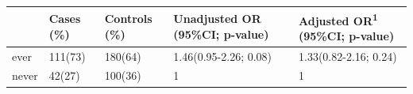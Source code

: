\begin{longtable}[]{@{}lllll@{}}
\toprule
\begin{minipage}[b]{0.06\columnwidth}\raggedright
\strut
\end{minipage} & \begin{minipage}[b]{0.10\columnwidth}\raggedright
Cases (\%)\strut
\end{minipage} & \begin{minipage}[b]{0.12\columnwidth}\raggedright
Controls (\%)\strut
\end{minipage} & \begin{minipage}[b]{0.29\columnwidth}\raggedright
Unadjusted OR (95\%CI; p-value)\strut
\end{minipage} & \begin{minipage}[b]{0.28\columnwidth}\raggedright
Adjusted OR\textsuperscript{1} (95\%CI; p-value)\strut
\end{minipage}\tabularnewline
\midrule
\endhead
\begin{minipage}[t]{0.06\columnwidth}\raggedright
ever\strut
\end{minipage} & \begin{minipage}[t]{0.10\columnwidth}\raggedright
111(73)\strut
\end{minipage} & \begin{minipage}[t]{0.12\columnwidth}\raggedright
180(64)\strut
\end{minipage} & \begin{minipage}[t]{0.29\columnwidth}\raggedright
1.46(0.95-2.26; 0.08)\strut
\end{minipage} & \begin{minipage}[t]{0.28\columnwidth}\raggedright
1.33(0.82-2.16; 0.24)\strut
\end{minipage}\tabularnewline
\begin{minipage}[t]{0.06\columnwidth}\raggedright
never\strut
\end{minipage} & \begin{minipage}[t]{0.10\columnwidth}\raggedright
42(27)\strut
\end{minipage} & \begin{minipage}[t]{0.12\columnwidth}\raggedright
100(36)\strut
\end{minipage} & \begin{minipage}[t]{0.29\columnwidth}\raggedright
1\strut
\end{minipage} & \begin{minipage}[t]{0.28\columnwidth}\raggedright
1\strut
\end{minipage}\tabularnewline
\bottomrule
\end{longtable}

